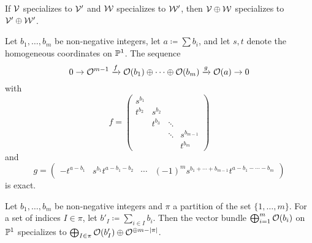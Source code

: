\begin{remark} \label{rem:specialization-sum}
	If $\mathcal{V}$ specializes to $\mathcal{V}'$ and $\mathcal{W}$ specializes to $\mathcal{W}'$, then $\mathcal{V}\oplus\mathcal{W}$ specializes to $\mathcal{V}'\oplus\mathcal{W}'$.
\end{remark}

\begin{remark} \label{rem:exact-sequence-exists}
	Let $b_1,\dotsc,b_m$ be non-negative integers, let $a\coloneqq \sum b_i$, and let $s,t$ denote the homogeneous coordinates on $\mathbb{P}^1$. The sequence
	\[ 0 \to \mathcal{O}^{m-1} \xrightarrow{f} \mathcal{O}(b_1)\oplus \dotsb \oplus \mathcal{O}(b_m) \xrightarrow{g} \mathcal{O}(a) \to 0 \]
	with \[
	f = \begin{pmatrix}
	s^{b_1}&        &	   &           \\
	t^{b_2}& s^{b_2}&      &           \\
	       & t^{b_3}&\ddots&           \\
	       &        &\ddots&s^{b_{m-1}}\\
	       &        &      &t^{b_m}
	\end{pmatrix} 
	\]
	and
	\[
	g = \begin{pmatrix}
	-t^{a-b_1} & s^{b_1}t^{a-b_1-b_2} & \cdots & (-1)^{m} s^{b_1 + \dotsb + b_{m-1}}t^{a-b_1-\dotsb-b_m}
	\end{pmatrix}
	\]
	is exact.
\end{remark}

\begin{proposition} \label{specialization-partitions}
	Let $b_1,\dotsc,b_m$ be non-negative integers and $\pi$ a partition of the set $\{1,\dotsc,m\}$. For a set of indices $I\in \pi$, let $b'_I \coloneqq \sum_{i \in I} b_i$. Then the vector bundle $\bigoplus_{i=1}^m \mathcal{O} (b_i)$ on $\mathbb{P}^1$ specializes to $\bigoplus_{I\in\pi} \mathcal{O}(b'_I) \oplus \mathcal{O}^{\oplus m-\lvert\pi\rvert}$.	
\end{proposition}

